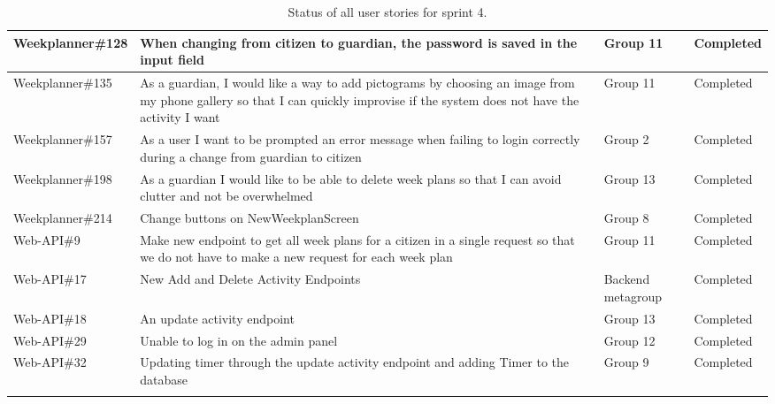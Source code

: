 \begin{longtable}{|p{2.9cm}|p{8cm}|p{2cm}|p{2cm}|}
    Weekplanner\#128 & When changing from citizen to guardian, the password is saved in the input field                                                                                                        & Group 11     & Completed    \\ \hline
    Weekplanner\#135 & As a guardian, I would like a way to add pictograms by choosing an image from my phone gallery so that I can quickly improvise if the system does not have the activity I want          & Group 11     & Completed   \\ \hline
    Weekplanner\#157 & As a user I want to be prompted an error message when failing to login correctly during a change from guardian to citizen                                                               & Group 2      & Completed    \\ \hline
    Weekplanner\#198 & As a guardian I would like to be able to delete week plans so that I can avoid clutter and not be overwhelmed                                                                           & Group 13     & Completed    \\ \hline
    Weekplanner\#214 & Change buttons on NewWeekplanScreen                                                                                                                                                     & Group 8      & Completed    \\ \hline
    Web-API\#9 & Make new endpoint to get all week plans for a citizen in a single request so that we do not have to make a new request for each week plan                                                                                                                                                      & Group 11      & Completed    \\ \hline
    Web-API\#17 & New Add and Delete Activity Endpoints                                                                                                                                                      & Backend metagroup     & Completed    \\ \hline
    Web-API\#18 & An update activity endpoint                                                                                                                                                      & Group 13     & Completed    \\ \hline
    Web-API\#29 & Unable to log in on the admin panel                                                                                                                                                       & Group 12     & Completed    \\ \hline
    Web-API\#32 & Updating timer through the update activity endpoint and adding Timer to the database                                                                                                                                                       & Group 9     & Completed    \\ \hline
    \caption{Status of all user stories for sprint 4.}\label{table:sprint-4-review}
\end{longtable}

